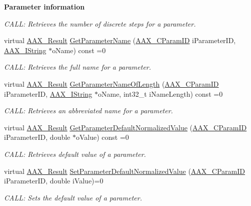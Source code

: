 \begin{Indent}{\bf Parameter information}
\begin{DoxyCompactItemize}
\begin{DoxyCompactList}\small\item\em C\+A\+L\+L\+: Retrieves the number of discrete steps for a parameter. \end{DoxyCompactList}\item 
virtual \hyperlink{a00149_a4d8f69a697df7f70c3a8e9b8ee130d2f}{A\+A\+X\+\_\+\+Result} \hyperlink{a00061_a8f8ae4b4346e708ec6de612ef99e5a92}{Get\+Parameter\+Name} (\hyperlink{a00149_a1440c756fe5cb158b78193b2fc1780d1}{A\+A\+X\+\_\+\+C\+Param\+I\+D} i\+Parameter\+I\+D, \hyperlink{a00113}{A\+A\+X\+\_\+\+I\+String} $\ast$o\+Name) const =0
\begin{DoxyCompactList}\small\item\em C\+A\+L\+L\+: Retrieves the full name for a parameter. \end{DoxyCompactList}\item 
virtual \hyperlink{a00149_a4d8f69a697df7f70c3a8e9b8ee130d2f}{A\+A\+X\+\_\+\+Result} \hyperlink{a00061_a5d556ae1fa4617a6439ef347139d70eb}{Get\+Parameter\+Name\+Of\+Length} (\hyperlink{a00149_a1440c756fe5cb158b78193b2fc1780d1}{A\+A\+X\+\_\+\+C\+Param\+I\+D} i\+Parameter\+I\+D, \hyperlink{a00113}{A\+A\+X\+\_\+\+I\+String} $\ast$o\+Name, int32\+\_\+t i\+Name\+Length) const =0
\begin{DoxyCompactList}\small\item\em C\+A\+L\+L\+: Retrieves an abbreviated name for a parameter. \end{DoxyCompactList}\item 
virtual \hyperlink{a00149_a4d8f69a697df7f70c3a8e9b8ee130d2f}{A\+A\+X\+\_\+\+Result} \hyperlink{a00061_a858f07ba021f8c9912bf91735b10314b}{Get\+Parameter\+Default\+Normalized\+Value} (\hyperlink{a00149_a1440c756fe5cb158b78193b2fc1780d1}{A\+A\+X\+\_\+\+C\+Param\+I\+D} i\+Parameter\+I\+D, double $\ast$o\+Value) const =0
\begin{DoxyCompactList}\small\item\em C\+A\+L\+L\+: Retrieves default value of a parameter. \end{DoxyCompactList}\item 
virtual \hyperlink{a00149_a4d8f69a697df7f70c3a8e9b8ee130d2f}{A\+A\+X\+\_\+\+Result} \hyperlink{a00061_a333b83bc6f37b0103ce0de65be02fede}{Set\+Parameter\+Default\+Normalized\+Value} (\hyperlink{a00149_a1440c756fe5cb158b78193b2fc1780d1}{A\+A\+X\+\_\+\+C\+Param\+I\+D} i\+Parameter\+I\+D, double i\+Value)=0
\begin{DoxyCompactList}\small\item\em C\+A\+L\+L\+: Sets the default value of a parameter. \end{DoxyCompactList}\item 

\end{DoxyCompactItemize}
\end{Indent}
